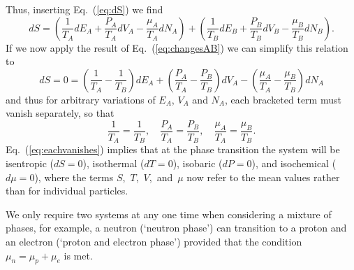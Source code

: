 \documentclass[11pt,a4paper,twoside]{carrollthesis}
\newcommand{\be}{\begin{equation}}
\newcommand{\ee}{\end{equation}}
\newcommand{\bea}{\begin{eqnarray}}
\newcommand{\eea}{\end{eqnarray}}
\newcommand{\reci}[1]{\frac{1}{#1}}
\begin{document}
%
Thus, inserting Eq.~(\ref{eq:dS}) we find
%
\be dS = \left(\reci{T_A} dE_A + \frac{P_A}{T_A} dV_A -
\frac{\mu_A}{T_A} dN_A \right) + \left(\reci{T_B} dE_B +
\frac{P_B}{T_B} dV_B - \frac{\mu_B}{T_B} dN_B \right).  \ee
%
If we now apply the result of Eq.~(\ref{eq:changesAB}) we can simplify
this relation to
%
\be \label{eq:maxS} dS = 0 = \left(\reci{T_A} - \reci{T_B}\right) dE_A
+ \left(\frac{P_A}{T_A} - \frac{P_B}{T_B}\right) dV_A -\left(
\frac{\mu_A}{T_A} - \frac{\mu_B}{T_B}\right) dN_A \ee
%
and thus for arbitrary variations of $E_A$, $V_A$ and $N_A$, each
bracketed term must vanish separately, so that
%
\be \label{eq:eachvanishes} \reci{T_A} = \reci{T_B}, \quad
\frac{P_A}{T_A} = \frac{P_B}{T_B}, \quad \frac{\mu_A}{T_A} =
\frac{\mu_B}{T_B}.  \ee
%
Eq.~(\ref{eq:eachvanishes}) implies that at the phase transition the
system will be isentropic ($dS=0$), isothermal ($dT=0$), isobaric
($dP=0$), and isochemical ($d\mu=0$), where the terms
$S$,~$T$,~$V$,~and~$\mu$ now refer to the mean values rather than for
individual particles.\par
%
We only require two systems at any one time when considering a mixture
of phases, for example, a neutron (`neutron phase') can transition to
a proton and an electron (`proton and electron phase') provided that
the condition $\mu_n = \mu_p + \mu_e$ is met.\par
%
%
\end{document}
